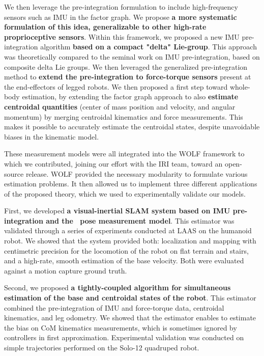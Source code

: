 We then leverage the pre-integration formulation to include high-frequency sensors such as IMU in the factor graph. We propose 
\textbf{a more systematic formulation of this idea, generalizable to other high-rate proprioceptive sensors}. Within this framework, we proposed a new 
IMU pre-integration algorithm \textbf{based on a compact "delta" Lie-group}.
This approach was theoretically compared to the seminal work on IMU pre-integration, based on composite delta Lie groups. 
We then leveraged the generalized pre-integration method to \textbf{extend the pre-integration to force-torque sensors} present at the end-effectors of
legged robots. 
We then proposed a first step toward whole-body estimation, by extending the factor graph approach to also \textbf{estimate centroidal quantities}
(center of mass position and velocity, and angular momentum) by merging centroidal kinematics and force measurements. This makes it possible 
to accurately estimate the centroidal states, despite unavoidable biases in the kinematic model. 


These measurement models were all integrated into the WOLF framework \cite{sola2021wolf} to which we contributed, joining our effort with the IRI team, 
toward an open-source release. WOLF provided the necessary modularity to formulate various estimation problems. 
It then allowed us to implement three different applications of the proposed theory, which we used to experimentally validate our models.

\bigskip

First, we developed \textbf{a visual-inertial SLAM system based on IMU pre-integration and the \apriltag\ pose measurement model}. This estimator was validated through
a series of experiments conducted at LAAS on the  humanoid robot. We showed that the system provided both: localization and mapping with centimetric precision
for the locomotion of the robot on flat terrain and stairs, and a high-rate, smooth estimation of the base velocity. Both were evaluated against a motion capture 
ground truth. 

Second, we proposed \textbf{a tightly-coupled algorithm for simultaneous estimation of the base and centroidal states of the robot}. This estimator combined the pre-integration 
of IMU and force-torque data, centroidal kinematics, and leg odometry. We showed that the estimator enables to estimate the bias on CoM kinematics measurements, which is sometimes ignored
by controllers in first approximation. Experimental validation was conducted on simple trajectories performed on the Solo-12 quadruped robot. 


